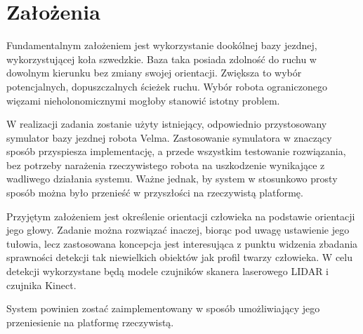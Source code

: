 \section{Założenia}

Fundamentalnym założeniem jest wykorzystanie dookólnej bazy jezdnej, wykorzystującej koła szwedzkie. Baza taka posiada zdolność do ruchu w dowolnym kierunku bez zmiany swojej orientacji. Zwiększa to wybór potencjalnych, dopuszczalnych ścieżek ruchu. Wybór robota ograniczonego więzami nieholonomicznymi mogłoby stanowić istotny problem. 

W realizacji zadania zostanie użyty istniejący, odpowiednio przystosowany symulator bazy jezdnej robota Velma. Zastosowanie symulatora w znaczący sposób przyspiesza implementację, a przede wszystkim testowanie rozwiązania, bez potrzeby narażenia rzeczywistego robota na uszkodzenie wynikające z wadliwego działania systemu. Ważne jednak, by system w stosunkowo prosty sposób można było przenieść w przyszłości na rzeczywistą platformę.

Przyjętym założeniem jest określenie orientacji człowieka na podstawie orientacji jego głowy. Zadanie można rozwiązać inaczej, biorąc pod uwagę ustawienie jego tułowia, lecz zastosowana koncepcja jest interesująca z punktu widzenia zbadania sprawności detekcji tak niewielkich obiektów jak profil twarzy człowieka. W celu detekcji wykorzystane będą modele czujników skanera laserowego LIDAR i czujnika Kinect.

System powinien zostać zaimplementowany w sposób umożliwiający jego przeniesienie na platformę rzeczywistą.



